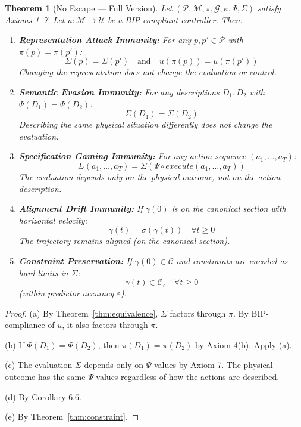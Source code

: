\documentclass[11pt]{article}
\newtheorem{theorem}{Theorem}[section]
\begin{document}
\begin{theorem}[No Escape --- Full Version]
\label{thm:noescape}
Let $(\mathcal{P}, \mathcal{M}, \pi, \mathcal{G}, \kappa, \Psi, \Sigma)$ satisfy Axioms 1--7. Let
$u : \mathcal{M} \to \mathcal{U}$ be a BIP-compliant controller. Then:
\begin{enumerate}
    \item[(a)] \textbf{Representation Attack Immunity:} For any $p, p' \in \mathcal{P}$ with $\pi(p) = \pi(p')$:
    \[
    \Sigma(p) = \Sigma(p') \quad \text{and} \quad u(\pi(p)) = u(\pi(p'))
    \]
    Changing the representation does not change the evaluation or control.

    \item[(b)] \textbf{Semantic Evasion Immunity:} For any descriptions $D_1, D_2$ with $\Psi(D_1) = \Psi(D_2)$:
    \[
    \Sigma(D_1) = \Sigma(D_2)
    \]
    Describing the same physical situation differently does not change the evaluation.

    \item[(c)] \textbf{Specification Gaming Immunity:} For any action sequence $(a_1, \ldots, a_T)$:
    \[
    \Sigma(a_1, \ldots, a_T) = \Sigma(\Psi \circ \mathit{execute}(a_1, \ldots, a_T))
    \]
    The evaluation depends only on the physical outcome, not on the action description.

    \item[(d)] \textbf{Alignment Drift Immunity:} If $\gamma(0)$ is on the canonical section with horizontal velocity:
    \[
    \gamma(t) = \sigma(\bar{\gamma}(t)) \quad \forall t \geq 0
    \]
    The trajectory remains aligned (on the canonical section).

    \item[(e)] \textbf{Constraint Preservation:} If $\bar{\gamma}(0) \in \mathcal{C}$ and constraints are encoded as hard limits in $\Sigma$:
    \[
    \bar{\gamma}(t) \in \mathcal{C}_\varepsilon \quad \forall t \geq 0
    \]
    (within predictor accuracy $\varepsilon$).
\end{enumerate}
\end{theorem}

\begin{proof}
(a) By Theorem~\ref{thm:equivalence}, $\Sigma$ factors through $\pi$. By BIP-compliance of $u$, it also factors through
$\pi$.

(b) If $\Psi(D_1) = \Psi(D_2)$, then $\pi(D_1) = \pi(D_2)$ by Axiom 4(b). Apply (a).

(c) The evaluation $\Sigma$ depends only on $\Psi$-values by Axiom 7. The physical outcome has the
same $\Psi$-values regardless of how the actions are described.

(d) By Corollary 6.6.

(e) By Theorem~\ref{thm:constraint}.
\end{proof}
\end{document}
